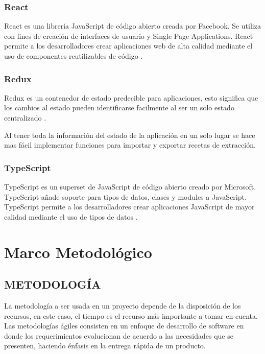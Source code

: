 \documentclass[12pt]{report}
\begin{document}
\subsection{React}

React es una librería JavaScript de código abierto creada por Facebook. Se utiliza con fines de creación de interfaces de usuario y Single Page Applications. React permite a los desarrolladores crear aplicaciones web de alta calidad mediante el uso de componentes reutilizables de código \cite{aggarwal2018modern}.

\subsection{Redux}

Redux es un contenedor de estado predecible para aplicaciones, esto significa que los cambios al estado pueden identificarse facilmente al ser un solo estado centralizado \cite{caspers2017react} .

Al tener toda la información del estado de la aplicación en un solo lugar se hace mas fácil implementar funciones para importar y exportar recetas de extracción.

\subsection{TypeScript}

TypeScript es un superset de JavaScript de código abierto creado por Microsoft. TypeScript añade soporte para tipos de datos, clases y modules a JavaScript. TypeScript permite a los desarrolladores crear aplicaciones JavaScript de mayor calidad mediante el uso de tipos de datos \cite{typescript2022}.


\chapter{Marco Metodológico}

\section[Metodología]{METODOLOGÍA}

La metodología a ser usada en un proyecto depende de la disposición de los recursos, en este caso, el tiempo es el recurso más importante a tomar en cuenta. Las metodologías ágiles consisten en un enfoque de desarrollo de software en donde los requerimientos evolucionan de acuerdo a las necesidades que se presenten, haciendo énfasis en la entrega rápida de un producto.
\end{document}
